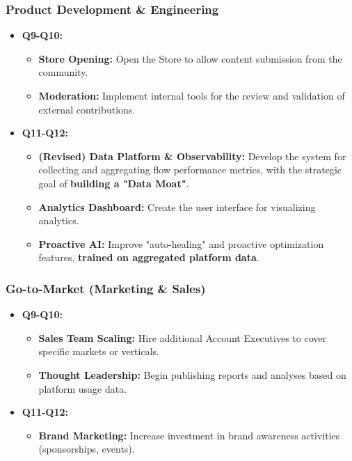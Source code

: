 \documentclass[11pt, a4paper, oneside]{article}
\begin{document}
\subsubsection{Product Development \& Engineering}
\begin{itemize}[leftmargin=*]
    \item \textbf{Q9-Q10:}
    \begin{itemize}
        \item \textbf{Store Opening:} Open the Store to allow content submission from the community.
        \item \textbf{Moderation:} Implement internal tools for the review and validation of external contributions.
    \end{itemize}
    \item \textbf{Q11-Q12:}
    \begin{itemize}
        \item \textbf{(Revised) Data Platform \& Observability:} Develop the system for collecting and aggregating flow performance metrics, with the strategic goal of \textbf{building a "Data Moat"}.
        \item \textbf{Analytics Dashboard:} Create the user interface for visualizing analytics.
        \item \textbf{Proactive AI:} Improve "auto-healing" and proactive optimization features, \textbf{trained on aggregated platform data}.
    \end{itemize}
\end{itemize}

\subsubsection{Go-to-Market (Marketing \& Sales)}
\begin{itemize}[leftmargin=*]
    \item \textbf{Q9-Q10:}
    \begin{itemize}
        \item \textbf{Sales Team Scaling:} Hire additional Account Executives to cover specific markets or verticals.
        \item \textbf{Thought Leadership:} Begin publishing reports and analyses based on platform usage data.
    \end{itemize}
    \item \textbf{Q11-Q12:}
    \begin{itemize}
        \item \textbf{Brand Marketing:} Increase investment in brand awareness activities (sponsorships, events).
    \end{itemize}
\end{itemize}
\end{document}
